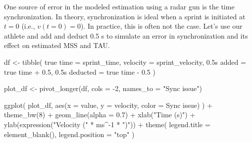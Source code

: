 \documentclass[fleqn,10pt]{wlpeerj} %
\newenvironment{Shaded}{\begin{snugshade}}{\end{snugshade}}
\newcommand{\AttributeTok}[1]{\textcolor[rgb]{0.77,0.63,0.00}{#1}}
\newcommand{\DecValTok}[1]{\textcolor[rgb]{0.00,0.00,0.81}{#1}}
\newcommand{\FloatTok}[1]{\textcolor[rgb]{0.00,0.00,0.81}{#1}}
\newcommand{\FunctionTok}[1]{\textcolor[rgb]{0.00,0.00,0.00}{#1}}
\newcommand{\NormalTok}[1]{#1}
\newcommand{\OtherTok}[1]{\textcolor[rgb]{0.56,0.35,0.01}{#1}}
\newcommand{\SpecialCharTok}[1]{\textcolor[rgb]{0.00,0.00,0.00}{#1}}
\newcommand{\StringTok}[1]{\textcolor[rgb]{0.31,0.60,0.02}{#1}}
\begin{document}
One source of error in the modeled estimation using a radar gun is the time synchronization. In theory, synchronization is ideal when a sprint is initiated at \(t=0\) (i.e., \(v(t=0) = 0\)). In practice, this is often not the case. Let's use our athlete and add and deduct 0.5 s to simulate an error in synchronization and its effect on estimated MSS and TAU.

\small

\begin{Shaded}
\begin{Highlighting}[]
\NormalTok{df }\OtherTok{\textless{}{-}} \FunctionTok{tibble}\NormalTok{(}
  \StringTok{\textasciigrave{}}\AttributeTok{true time}\StringTok{\textasciigrave{}} \OtherTok{=}\NormalTok{ sprint\_time,}
  \AttributeTok{velocity =}\NormalTok{ sprint\_velocity,}
  \StringTok{\textasciigrave{}}\AttributeTok{0.5s added}\StringTok{\textasciigrave{}} \OtherTok{=} \StringTok{\textasciigrave{}}\AttributeTok{true time}\StringTok{\textasciigrave{}} \SpecialCharTok{+} \FloatTok{0.5}\NormalTok{,}
  \StringTok{\textasciigrave{}}\AttributeTok{0.5s deducted}\StringTok{\textasciigrave{}} \OtherTok{=} \StringTok{\textasciigrave{}}\AttributeTok{true time}\StringTok{\textasciigrave{}} \SpecialCharTok{{-}} \FloatTok{0.5}
\NormalTok{)}

\NormalTok{plot\_df }\OtherTok{\textless{}{-}} \FunctionTok{pivot\_longer}\NormalTok{(df, }\AttributeTok{cols =} \SpecialCharTok{{-}}\DecValTok{2}\NormalTok{, }\AttributeTok{names\_to =} \StringTok{"Sync issue"}\NormalTok{)}

\FunctionTok{ggplot}\NormalTok{(}
\NormalTok{  plot\_df,}
  \FunctionTok{aes}\NormalTok{(}\AttributeTok{x =}\NormalTok{ value, }\AttributeTok{y =}\NormalTok{ velocity, }\AttributeTok{color =} \StringTok{\textasciigrave{}}\AttributeTok{Sync issue}\StringTok{\textasciigrave{}}\NormalTok{)}
\NormalTok{) }\SpecialCharTok{+}
  \FunctionTok{theme\_bw}\NormalTok{(}\DecValTok{8}\NormalTok{) }\SpecialCharTok{+}
  \FunctionTok{geom\_line}\NormalTok{(}\AttributeTok{alpha =} \FloatTok{0.7}\NormalTok{) }\SpecialCharTok{+}
  \FunctionTok{xlab}\NormalTok{(}\StringTok{"Time (s)"}\NormalTok{) }\SpecialCharTok{+}
  \FunctionTok{ylab}\NormalTok{(}\FunctionTok{expression}\NormalTok{(}\StringTok{"Velocity ("} \SpecialCharTok{*}\NormalTok{ ms}\SpecialCharTok{\^{}{-}}\DecValTok{1} \SpecialCharTok{*} \StringTok{")"}\NormalTok{)) }\SpecialCharTok{+}
  \FunctionTok{theme}\NormalTok{(}
    \AttributeTok{legend.title =} \FunctionTok{element\_blank}\NormalTok{(),}
    \AttributeTok{legend.position =} \StringTok{"top"}
\NormalTok{  )}
\end{Highlighting}
\end{Shaded}
\end{document}
